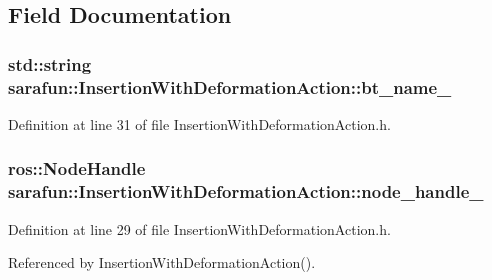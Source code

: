 \subsection{Field Documentation}
\hypertarget{classsarafun_1_1InsertionWithDeformationAction_aa5a6397046e4d8ac145d2961d04fc27c_aa5a6397046e4d8ac145d2961d04fc27c}{
\subsubsection[{bt\-\_\-name\-\_\-}]{\setlength{\rightskip}{0pt plus 5cm}std\-::string sarafun\-::\-Insertion\-With\-Deformation\-Action\-::bt\-\_\-name\-\_\-\hspace{0.3cm}{\ttfamily [private]}}}\label{classsarafun_1_1InsertionWithDeformationAction_aa5a6397046e4d8ac145d2961d04fc27c_aa5a6397046e4d8ac145d2961d04fc27c}


Definition at line 31 of file Insertion\-With\-Deformation\-Action.\-h.

\hypertarget{classsarafun_1_1InsertionWithDeformationAction_a97fcbe6b19d7f2185e19f5e8397b2307_a97fcbe6b19d7f2185e19f5e8397b2307}{
\subsubsection[{node\-\_\-handle\-\_\-}]{\setlength{\rightskip}{0pt plus 5cm}ros\-::\-Node\-Handle sarafun\-::\-Insertion\-With\-Deformation\-Action\-::node\-\_\-handle\-\_\-\hspace{0.3cm}{\ttfamily [private]}}}\label{classsarafun_1_1InsertionWithDeformationAction_a97fcbe6b19d7f2185e19f5e8397b2307_a97fcbe6b19d7f2185e19f5e8397b2307}


Definition at line 29 of file Insertion\-With\-Deformation\-Action.\-h.



Referenced by Insertion\-With\-Deformation\-Action().

